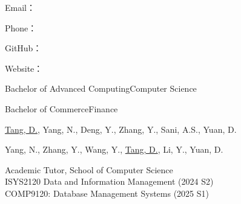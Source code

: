\documentclass[11pt]{article}
\begin{document}
\hspace{10pt}
\begin{minipage}[t]{0.7\textwidth}
  \hspace{-35pt}
  {\Huge \MyNameEN}

  \vspace{1em}
  \hspace{-33pt}
  Email：\MyEmail 

  \hspace{-33pt}
	Phone：\MyPhone 

  \hspace{-33pt}
	GitHub：\href{\MyGitHub}{\MyGitHub}

  \hspace{-33pt}
	Website：\href{\MyWebsite}{\MyWebsite}
\end{minipage}
\hfill

\vspace{1em}


{Bachelor of Advanced Computing}{Computer Science}

{Bachelor of Commerce}{Finance}


{\underline{Tang, D.}, Yang, N., Deng, Y., Zhang, Y., Sani, A.S., Yuan, D.}

{Yang, N., Zhang, Y., Wang, Y., \underline{Tang, D.}, Li, Y., Yuan, D.}


{Academic Tutor, School of Computer Science}
{\\
ISYS2120 Data and Information Management (2024 S2) \\
COMP9120: Database Management Systems (2025 S1)
}
\end{document}

